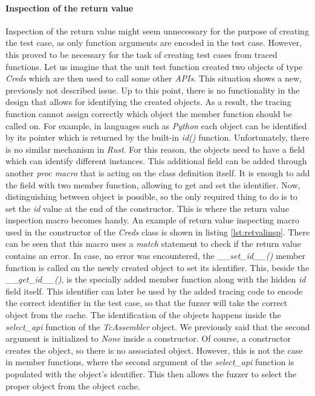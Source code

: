 \paragraph{Inspection of the return value}
Inspection of the return value might seem unnecessary for the purpose of creating the test case, as only function arguments are encoded in the test case. However, this proved to be necessary for the task of creating test cases from traced functions. Let us imagine that the unit test function created two objects of type \textit{Creds} which are then used to call some other \textit{APIs}. This situation shows a new, previously not described issue. Up to this point, there is no functionality in the design that allows for identifying the created objects. As a result, the tracing function cannot assign correctly which object the member function should be called on. For example, in languages such as \textit{Python} each object can be identified by its pointer which is returned by the built-in \textit{id()} function. Unfortunately, there is no similar mechanism in \textit{Rust}. For this reason, the objects need to have a field which can identify different instances. This additional field can be added through another \textit{proc macro} that is acting on the class definition itself. It is enough to add the field with two member function, allowing to get and set the identifier. Now, distinguishing between object is possible, so the only required thing to do is to set the \textit{id} value at the end of the constructor. This is where the return value inspection macro becomes handy. An example of return value inspecting macro used in the constructor of the \textit{Creds} class is shown in listing \ref{lst:retvalinsp}. There can be seen that this macro uses a \textit{match} statement to check if the return value contains an error. In case, no error was encountered, the \textit{\_\_set\_id\_\_()} member function is called on the newly created object to set its identifier. This, beside the \textit{\_\_get\_id\_\_()}, is the specially added member function along with the hidden \textit{id} field itself. This identifier can later be used by the added tracing code to encode the correct identifier in the test case, so that the fuzzer will take the correct object from the cache. The identification of the objects happens inside the \textit{select\_api} function of the \textit{TcAssembler} object. We previously said that the second argument is initialized to \textit{None} inside a constructor. Of course, a constructor creates the object, so there is no associated object. However, this is not the case in member functions, where the second argument of the \textit{select\_api} function is populated with the object's identifier. This then allows the fuzzer to select the proper object from the object cache.


